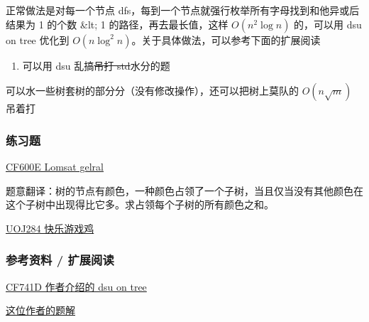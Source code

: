 正常做法是对每一个节点 dfs，每到一个节点就强行枚举所有字母找到和他异或后结果为 1 的个数 \&lt; 1 的路径，再去最长值，这样 $O(n^2\log n)$ 的，可以用 dsu on tree 优化到 $O(n\log^2n)$。关于具体做法，可以参考下面的扩展阅读

\begin{enumerate}
\item 可以用 dsu 乱搞\st{吊打 std}水分的题
\end{enumerate}

可以水一些树套树的部分分（没有修改操作），还可以把树上莫队的 $O(n\sqrt{m})$ 吊着打

\subsubsection{练习题}

\href{http://codeforces.com/problemset/problem/600/E}{CF600E Lomsat gelral}

题意翻译：树的节点有颜色，一种颜色占领了一个子树，当且仅当没有其他颜色在这个子树中出现得比它多。求占领每个子树的所有颜色之和。

\href{http://uoj.ac/problem/284}{UOJ284 快乐游戏鸡}

\subsubsection{参考资料 / 扩展阅读}

\href{http://codeforces.com/blog/entry/44351}{CF741D 作者介绍的 dsu on tree}

\href{http://codeforces.com/blog/entry/48871}{这位作者的题解}
